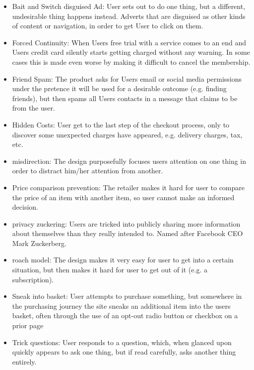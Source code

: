 \begin{itemize}
  \item Bait and Switch disguised Ad: User sets out to do one thing, but a different, undesirable thing happens instead. Adverts that are disguised as other kinds of content or navigation, in order to get User to click on them.
  \item Forced Continuity: When Users free trial with a service comes to an end and Users credit card silently starts getting charged without any warning. In some cases this is made even worse by making it difficult to cancel the membership.
  \item Friend Spam: The product asks for Users email or social media permissions under the pretence it will be used for a desirable outcome (e.g. finding friends), but then spams all Users contacts in a message that claims to be from the user.
  \item Hidden Costs: User get to the last step of the checkout process, only to discover some unexpected charges have appeared, e.g. delivery charges, tax, etc.
  \item misdirection: The design purposefully focuses users attention on one thing in order to distract him/her attention from another.
  \item Price comparison prevention: The retailer makes it hard for user to compare the price of an item with another item, so user cannot make an informed decision.
  \item privacy zuckering: Users are tricked into publicly sharing more information about themselves than they really intended to. Named after Facebook CEO Mark Zuckerberg.
  \item roach model: The design makes it very easy for user to get into a certain situation, but then makes it hard for user to get out of it (e.g. a subscription).
  \item Sneak into basket: User attempts to purchase something, but somewhere in the purchasing journey the site sneaks an additional item into the users basket, often through the use of an opt-out radio button or checkbox on a prior page
  \item Trick questions: User responds to a question, which, when glanced upon quickly appears to ask one thing, but if read carefully, asks another thing entirely.
\end{itemize}


